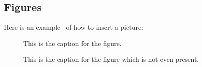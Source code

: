 


\subsection{Figures}
Here is an example~\cite{JohSil05} of how to insert a picture:

\begin{figure}[!ht]
\centering
{}
\caption{This is the caption for the figure.}
\label{fig:Pict}
\end{figure}


\begin{figure}[!ht]
\centering
{}
\caption{This is the caption for the figure which is not even present.}
\label{fig:PictMis}
\end{figure}


